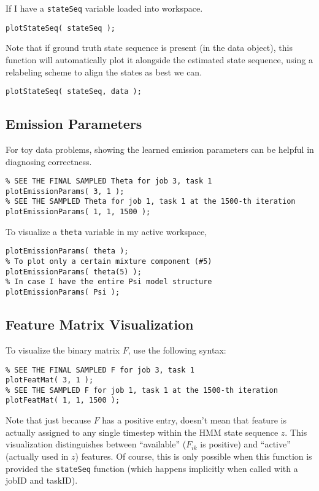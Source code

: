 \documentclass[fontsize=12]{article}
\begin{document}
If I have a \texttt{stateSeq} variable loaded into workspace.

\texttt{plotStateSeq( stateSeq ); }

Note that if ground truth state sequence is present (in the data object), this function will automatically plot it alongside the estimated state sequence, using a relabeling scheme to align the states as best we can.

\texttt{plotStateSeq( stateSeq, data ); }


\subsection{Emission Parameters}

For toy data problems, showing the learned emission parameters can be helpful in diagnosing correctness. 

\begin{verbatim}
% SEE THE FINAL SAMPLED Theta for job 3, task 1
plotEmissionParams( 3, 1 );
% SEE THE SAMPLED Theta for job 1, task 1 at the 1500-th iteration
plotEmissionParams( 1, 1, 1500 );
\end{verbatim}

To visualize a \texttt{theta} variable in my active workspace,

\begin{verbatim}
plotEmissionParams( theta );
% To plot only a certain mixture component (#5)
plotEmissionParams( theta(5) );
% In case I have the entire Psi model structure
plotEmissionParams( Psi );
\end{verbatim}

\subsection{Feature Matrix Visualization}

To visualize the binary matrix $F$, use the following syntax:
\begin{verbatim}
% SEE THE FINAL SAMPLED F for job 3, task 1
plotFeatMat( 3, 1 );
% SEE THE SAMPLED F for job 1, task 1 at the 1500-th iteration
plotFeatMat( 1, 1, 1500 );
\end{verbatim}

Note that just because $F$ has a positive entry, doesn't mean that feature is actually assigned to any single timestep within the HMM state sequence $z$.  This visualization distinguishes between ``available'' ($F_{ik}$ is positive) and ``active'' (actually used in $z$) features.  Of course, this is only possible when this function is provided the \texttt{stateSeq} function (which happens implicitly when called with a jobID and taskID). 
\end{document}
